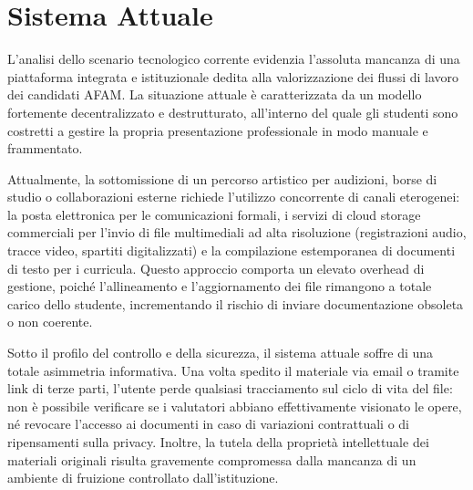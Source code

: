 \section{Sistema Attuale}


L'analisi dello scenario tecnologico corrente evidenzia l'assoluta mancanza di una piattaforma integrata e istituzionale dedita alla valorizzazione dei flussi di lavoro dei candidati AFAM. La situazione attuale \`e caratterizzata da un modello fortemente decentralizzato e destrutturato, all'interno del quale gli studenti sono costretti a gestire la propria presentazione professionale in modo manuale e frammentato.

Attualmente, la sottomissione di un percorso artistico per audizioni, borse di studio o collaborazioni esterne richiede l'utilizzo concorrente di canali eterogenei: la posta elettronica per le comunicazioni formali, i servizi di cloud storage commerciali per l'invio di file multimediali ad alta risoluzione (registrazioni audio, tracce video, spartiti digitalizzati) e la compilazione estemporanea di documenti di testo per i curricula. Questo approccio comporta un elevato overhead di gestione, poich\'e l'allineamento e l'aggiornamento dei file rimangono a totale carico dello studente, incrementando il rischio di inviare documentazione obsoleta o non coerente.

Sotto il profilo del controllo e della sicurezza, il sistema attuale soffre di una totale asimmetria informativa. Una volta spedito il materiale via email o tramite link di terze parti, l'utente perde qualsiasi tracciamento sul ciclo di vita del file: non \`e possibile verificare se i valutatori abbiano effettivamente visionato le opere, n\'e revocare l'accesso ai documenti in caso di variazioni contrattuali o di ripensamenti sulla privacy. Inoltre, la tutela della propriet\`a intellettuale dei materiali originali risulta gravemente compromessa dalla mancanza di un ambiente di fruizione controllato dall'istituzione.
